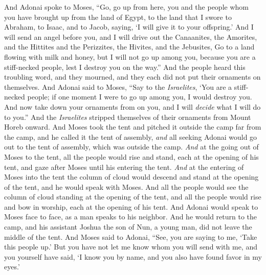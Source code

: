 \begin{biblechapter} %
 And Adonai spoke to Moses, “Go, go up from here, you and the people whom you have brought up from the land of Egypt, to the land that I swore to Abraham, to Isaac, and to Jacob, saying, ‘I will give it to your offspring.’
\verse And I will send an angel before you, and I will drive out the Canaanites, the Amorites, and the Hittites and the Perizzites, the Hivites, and the Jebusites,
\verse Go to a land flowing with milk and honey, but I will not go up among you, because you are a stiff-necked people, lest I destroy you on the way.”
\verse And the people heard this troubling word, and they mourned, and they each did not put their ornaments on themselves.
\verse And Adonai said to Moses, “Say to the \textit{Israelites}, ‘You are a stiff-necked people; if one moment I were to go up among you, I would destroy you. And now take down your ornaments from on you, and I will \textit{decide} what I will do to you.”
\verse And the \textit{Israelites} stripped themselves of their ornaments from Mount Horeb onward.
 And Moses took the tent and pitched it outside the camp far from the camp, and he called it the tent of assembly, \textit{and} all seeking Adonai would go out to the tent of assembly, which was outside the camp.
\verse \textit{And} at the going out of Moses to the tent, all the people would rise and stand, each at the opening of his tent, and gaze after Moses until his entering the tent.
\verse \textit{And} at the entering of Moses into the tent the column of cloud would descend and stand at the opening of the tent, and he would speak with Moses.
\verse And all the people would see the column of cloud standing at the opening of the tent, and all the people would rise and bow in worship, each at the opening of his tent.
\verse And Adonai would speak to Moses face to face, as a man speaks to his neighbor. And he would return to the camp, and his assistant Joshua the son of Nun, a young man, did not leave the middle of the tent.
 And Moses said to Adonai, “See, you are saying to me, ‘Take this people up.’ But you have not let me know whom you will send with me, and you yourself have said, ‘I know you by name, and you also have found favor in my eyes.’

\end{biblechapter}
